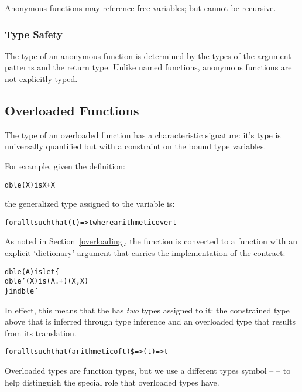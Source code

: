 \begin{aside}
Anonymous functions may reference free variables; but cannot be recursive.
\end{aside}


\subsubsection{Type Safety}
The type of an anonymous function is determined by the types of the argument patterns and the return type. Unlike named functions, anonymous functions are not explicitly typed.

\begin{prooftree}
\end{prooftree}


\subsection{Overloaded Functions}
\label{overloadedFunctions}
The type of an overloaded function has a characteristic signature: it's type is universally quantified but with a constraint on the bound type variables.

For example, given the definition:
\begin{alltt}
dble(X) is X+X
\end{alltt}
the generalized type assigned to the  variable is:
\begin{alltt}
for all t such that (t)=>t where arithmetic over t
\end{alltt}

As noted in Section~\vref{overloading}, the  function is converted to a function with an explicit `dictionary' argument that carries the implementation of the  contract:
\begin{alltt}
dble(A) is let\{
  dble'(X) is (A.+)(X,X)
\} in dble'
\end{alltt}
In effect, this means that the  has \emph{two} types assigned to it: the constrained type above that is inferred through type inference and an overloaded type that results from its translation.
\begin{alltt}
for all t such that (arithmetic of t) \$=> (t)=>t
\end{alltt}
\begin{aside}
Overloaded types are function types, but we use a different types symbol -- \q{\$=>} -- to help distinguish the special role that overloaded types have.
\end{aside}

